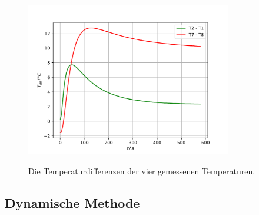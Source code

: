 \begin{figure}
\centering
\caption{Die Temperaturdifferenzen der vier gemessenen Temperaturen.}
\includegraphics[width = 0.8\textwidth]{content/data/statsisch_vergleich.pdf}
\label{fig:stat_vergleich}
\end{figure}
\FloatBarrier

\subsection{Dynamische Methode}

